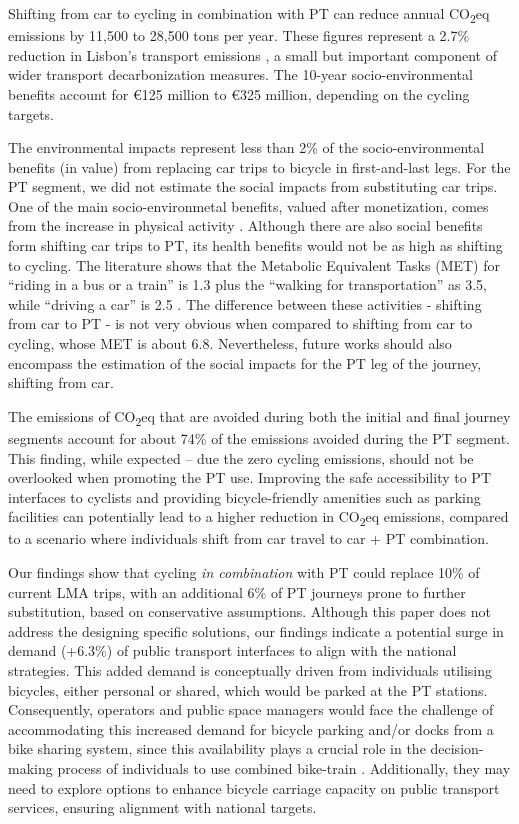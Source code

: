\documentclass[review, doubleblind, 3p,
authoryear]{elsarticle} %
\begin{document}
Shifting from car to cycling in combination with PT can reduce annual
CO\textsubscript{2}eq emissions by 11,500 to 28,500 tons per year. These
figures represent a 2.7\% reduction in Lisbon's transport emissions
\citep{LisboaENova}, a small but important component of wider transport
decarbonization measures. The 10-year socio-environmental benefits
account for €125 million to €325 million, depending on the cycling
targets.

The environmental impacts represent less than 2\% of the
socio-environmental benefits (in value) from replacing car trips to
bicycle in first-and-last legs. For the PT segment, we did not estimate
the social impacts from substituting car trips. One of the main
socio-environmetal benefits, valued after monetization, comes from the
increase in physical activity \citep{Felix2023ES}. Although there are
also social benefits form shifting car trips to PT, its health benefits
would not be as high as shifting to cycling. The literature shows that
the Metabolic Equivalent Tasks (MET) for ``riding in a bus or a train''
is 1.3 plus the ``walking for transportation'' as 3.5, while ``driving a
car'' is 2.5 \citep{MET2011}. The difference between these activities -
shifting from car to PT - is not very obvious when compared to shifting
from car to cycling, whose MET is about 6.8. Nevertheless, future works
should also encompass the estimation of the social impacts for the PT
leg of the journey, shifting from car.

The emissions of CO\textsubscript{2}eq that are avoided during both the
initial and final journey segments account for about 74\% of the
emissions avoided during the PT segment. This finding, while expected --
due the zero cycling emissions, should not be overlooked when promoting
the PT use. Improving the safe accessibility to PT interfaces to
cyclists and providing bicycle-friendly amenities such as parking
facilities can potentially lead to a higher reduction in
CO\textsubscript{2}eq emissions, compared to a scenario where
individuals shift from car travel to car + PT combination.

Our findings show that cycling \emph{in combination} with PT could
replace 10\% of current LMA trips, with an additional 6\% of PT journeys
prone to further substitution, based on conservative assumptions.
Although this paper does not address the designing specific solutions,
our findings indicate a potential surge in demand (+6.3\%) of public
transport interfaces to align with the national strategies. This added
demand is conceptually driven from individuals utilising bicycles,
either personal or shared, which would be parked at the PT stations.
Consequently, operators and public space managers would face the
challenge of accommodating this increased demand for bicycle parking
and/or docks from a bike sharing system, since this availability plays a
crucial role in the decision-making process of individuals to use
combined bike-train \citep{jonkeren2021bicycle}. Additionally, they may
need to explore options to enhance bicycle carriage capacity on public
transport services, ensuring alignment with national targets.
\end{document}
